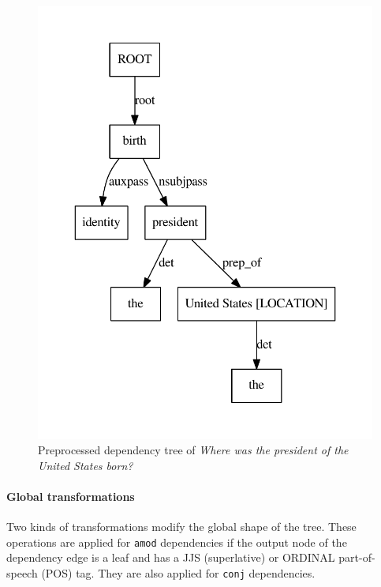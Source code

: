 \begin{figure}
  \centering
    \includegraphics[scale=0.6]{../examples_NLP_grammatical/tree2bis.pdf}
  \caption{Preprocessed dependency tree of \emph{Where was the president of the United States born?}}
  \label{tree_two}
\end{figure}


\paragraph{Global transformations}
\label{glt}

Two kinds of transformations modify the global shape of the tree. These operations are applied for \texttt{amod} dependencies if the output node of the dependency edge is a leaf and has a JJS (superlative) or ORDINAL part-of-speech (POS) tag. They are also applied for \texttt{conj} dependencies. 

